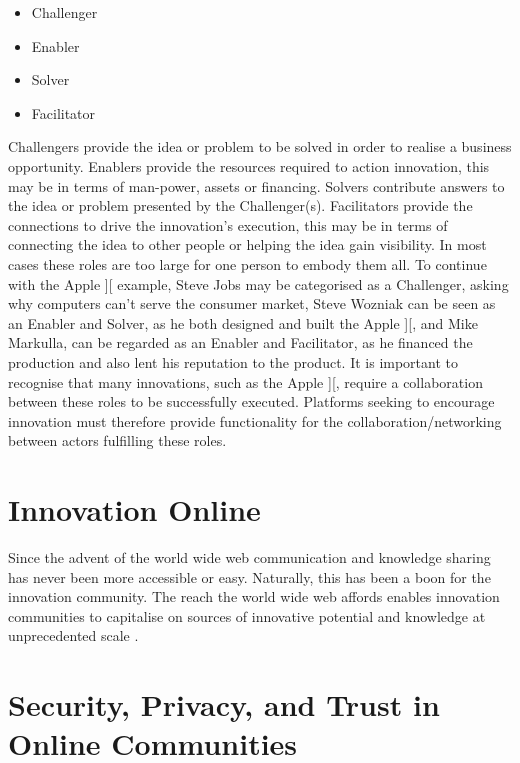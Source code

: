 \begin{itemize}
	\item Challenger
	\item Enabler
	\item Solver
	\item Facilitator
\end{itemize}

Challengers provide the idea or problem to be solved in order to realise a business opportunity. Enablers provide the resources required to action innovation, this may be in terms of man-power, assets or financing. Solvers contribute answers to the idea or problem presented by the Challenger(s). Facilitators provide the connections to drive the innovation's execution, this may be in terms of connecting the idea to other people or helping the idea gain visibility. In most cases these roles are too large for one person to embody them all. To continue with the Apple ][ example, Steve Jobs may be categorised as a Challenger, asking why computers can't serve the consumer market, Steve Wozniak can be seen as an Enabler and Solver, as he both designed and built the Apple ][, and Mike Markulla, can be regarded as an Enabler and Facilitator, as he financed the production and also lent his reputation to the product. It is important to recognise that many innovations, such as the Apple ][, require a collaboration between these roles to be successfully executed. Platforms seeking to encourage innovation must therefore provide functionality for the collaboration/networking between actors fulfilling these roles.

\section{Innovation Online}
Since the advent of the world wide web communication and knowledge sharing has never been more accessible or easy. Naturally, this has been a boon for the innovation community. The reach the world wide web affords enables innovation communities to capitalise on sources of innovative potential and knowledge at unprecedented scale \cite{hautz2010establish}.

\section{Security, Privacy, and Trust in Online Communities}

